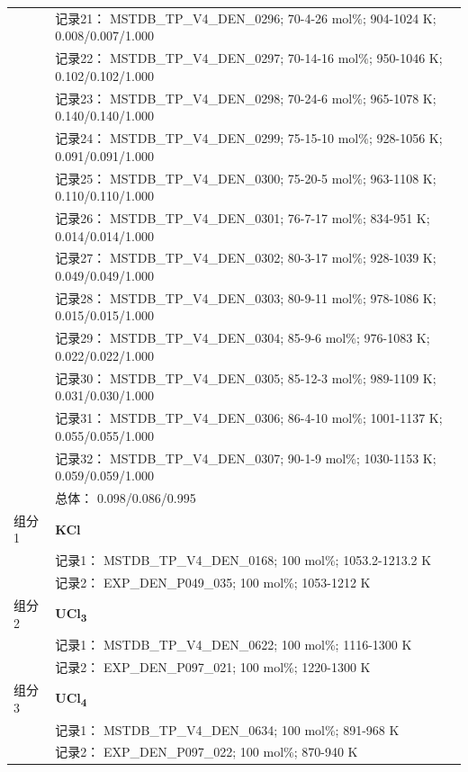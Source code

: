 \documentclass[12pt]{article}
\begin{document}
{\begin{longtable}[]{@{}
  >{\raggedright\arraybackslash}p{}
  >{\raggedright\arraybackslash}p{}@{}}
 & 记录21： MSTDB\_TP\_V4\_DEN\_0296; 70-4-26 mol\%; 904-1024 K; 0.008/0.007/1.000 \\
 & 记录22： MSTDB\_TP\_V4\_DEN\_0297; 70-14-16 mol\%; 950-1046 K; 0.102/0.102/1.000 \\
 & 记录23： MSTDB\_TP\_V4\_DEN\_0298; 70-24-6 mol\%; 965-1078 K; 0.140/0.140/1.000 \\
 & 记录24： MSTDB\_TP\_V4\_DEN\_0299; 75-15-10 mol\%; 928-1056 K; 0.091/0.091/1.000 \\
 & 记录25： MSTDB\_TP\_V4\_DEN\_0300; 75-20-5 mol\%; 963-1108 K; 0.110/0.110/1.000 \\
 & 记录26： MSTDB\_TP\_V4\_DEN\_0301; 76-7-17 mol\%; 834-951 K; 0.014/0.014/1.000 \\
 & 记录27： MSTDB\_TP\_V4\_DEN\_0302; 80-3-17 mol\%; 928-1039 K; 0.049/0.049/1.000 \\
 & 记录28： MSTDB\_TP\_V4\_DEN\_0303; 80-9-11 mol\%; 978-1086 K; 0.015/0.015/1.000 \\
 & 记录29： MSTDB\_TP\_V4\_DEN\_0304; 85-9-6 mol\%; 976-1083 K; 0.022/0.022/1.000 \\
 & 记录30： MSTDB\_TP\_V4\_DEN\_0305; 85-12-3 mol\%; 989-1109 K; 0.031/0.030/1.000 \\
 & 记录31： MSTDB\_TP\_V4\_DEN\_0306; 86-4-10 mol\%; 1001-1137 K; 0.055/0.055/1.000 \\
 & 记录32： MSTDB\_TP\_V4\_DEN\_0307; 90-1-9 mol\%; 1030-1153 K; 0.059/0.059/1.000 \\
 & 总体： 0.098/0.086/0.995  \\

组分 1  & \textbf{KCl} \\
 & 记录1： MSTDB\_TP\_V4\_DEN\_0168; 100 mol\%; 1053.2-1213.2 K \\
 & 记录2： EXP\_DEN\_P049\_035; 100 mol\%; 1053-1212 K  \\

组分 2  & \textbf{UCl\textsubscript{3}} \\
 & 记录1： MSTDB\_TP\_V4\_DEN\_0622; 100 mol\%; 1116-1300 K \\
 & 记录2： EXP\_DEN\_P097\_021; 100 mol\%; 1220-1300 K  \\

组分 3  & \textbf{UCl\textsubscript{4}} \\
 & 记录1： MSTDB\_TP\_V4\_DEN\_0634; 100 mol\%; 891-968 K \\
 & 记录2： EXP\_DEN\_P097\_022; 100 mol\%; 870-940 K  \\


\end{longtable}}
\end{document}
